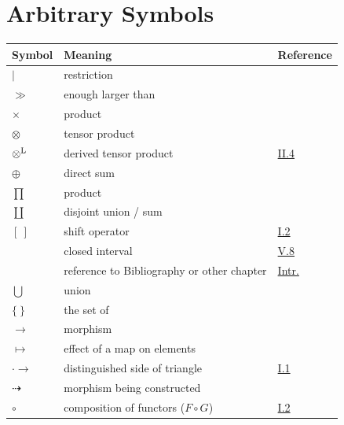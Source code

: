 \section*{Arbitrary Symbols}
\begingroup
\renewcommand{\arraystretch}{0.8}
\begin{longtable}{@{}l p{8cm} l@{}}
	\toprule
	Symbol & Meaning & Reference \\
	\midrule
	$\vert$ & restriction & \\
	$\gg$ & enough larger than & \\
	$\times$ & product & \\
	$\otimes$ & tensor product & \\
	$\mathbin{\otimes^{\mathrm{L}}}$ & derived tensor product & \hyperref[sec:2.4]{II.4} \\
	$\oplus$ & direct sum & \\
	$\prod$ & product & \\
	$\coprod$ & disjoint union / sum & \\
	$[\ ]$ & shift operator & \hyperref[sec:1.2]{I.2} \\
	 & closed interval & \hyperref[sec:5.8]{V.8} \\
	& reference to Bibliography or other chapter & \hyperref[chap:introduction]{Intr.} \\
	$\bigcup$ & union & \\
	$\{\ \}$ & the set of & \\
	$\to$ & morphism & \\
	$\mapsto$ & effect of a map on elements & \\
	$\cdot\to$ & distinguished side of triangle & \hyperref[sec:1.1]{I.1} \\
	$\dashrightarrow$ & morphism being constructed & \\
	$\circ$ & composition of functors ($F\circ G$) & \hyperref[sec:1.2]{I.2} \\
\end{longtable}
\endgroup
\nocite{*}
\begingroup\setlength{\emergencystretch}{2em}
\printbibliography[title={Bibliography}]
\endgroup
\appendix
